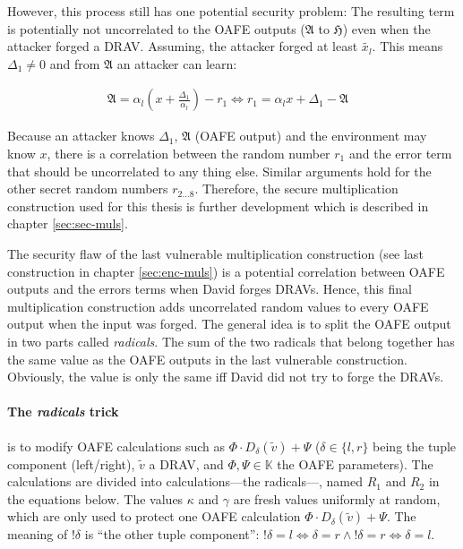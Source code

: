 However, this process still has one potential security problem: The resulting
term is potentially not uncorrelated to the OAFE outputs ($\mathfrak{A}$ to
$\mathfrak{H}$) even when the attacker forged a DRAV. Assuming, the attacker
forged at least $\widetilde{x_l}$. This means $\Delta_1 \neq 0$ and from
$\mathfrak{A}$ an attacker can learn:

\begin{align*}
  \mathfrak{A} = \alpha_l (x+\frac{\Delta_1}{\alpha_l}) - r_1
  \Leftrightarrow r_1 = \alpha_l x + \Delta_1 - \mathfrak{A} &
\end{align*}

Because an attacker knows $\Delta_1$,  $\mathfrak{A}$ (OAFE output) and the
environment may know $x$, there is a correlation between the random number $r_1$
and the error term that should be uncorrelated to any thing else. Similar
arguments hold for the other secret random numbers $r_{2 \ldots 8}$. Therefore,
the secure multiplication construction used for this thesis is further
development which is described in chapter \ref{sec:sec-muls}.


\label{sec:sec-muls}

The security flaw of the last vulnerable multiplication construction (see last
construction in chapter \ref{sec:enc-muls}) is a potential correlation between
OAFE outputs and the errors terms when David forges DRAVs. Hence, this final
multiplication construction adds uncorrelated random values to every OAFE output
when the input was forged. The general idea is to split the OAFE output in two
parts called \emph{radicals}. The sum of the two radicals that belong together
has the same value as the OAFE outputs in the last vulnerable construction.
Obviously, the value is only the same iff David did not try to forge the DRAVs.

\paragraph{The \emph{radicals} trick} is to modify OAFE calculations such as
$\Phi \cdot D_\delta(\widetilde{v}) + \Psi$ ($\delta \in \{l, r\}$ being the
tuple component (left/right), $\widetilde{v}$ a DRAV, and $\Phi, \Psi \in
\mathbb{K}$ the OAFE parameters). The calculations are divided into
calculations---the radicals---, named $R_1$ and $R_2$ in the equations below.
The values $\kappa$ and $\gamma$ are fresh values uniformly at random, which are
only used to protect one OAFE calculation $\Phi \cdot D_\delta(\widetilde{v}) +
\Psi$. The meaning of $!\delta$ is ``the other tuple component'': $!\delta = l
\Leftrightarrow \delta = r \wedge !\delta = r \Leftrightarrow \delta = l$.


